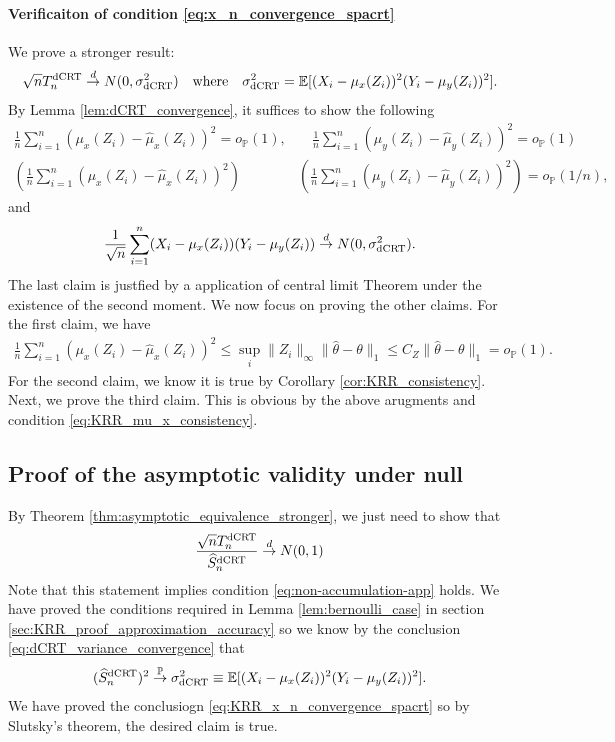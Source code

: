 \documentclass[12pt]{article}
\theoremstyle{definition}
\def\P{\mathbb{P}}
\def\P{\mathbb{P}}
\newcommand{\E}{\mathbb E}								%
\renewcommand{\P}{\mathbb{P}}							%
\newcommand{\convp}{\overset{\mathbb{P}}{\rightarrow}}             %
\newcommand{\convd}{\overset d \rightarrow}             %
\newcommand{\srx}{X}									%
\newcommand{\srz}{Z}									%
\newcommand{\sry}{Y}									%
\newcommand{\dCRT}{\textnormal{dCRT}} 					%
\begin{document}
\paragraph{Verificaiton of condition \eqref{eq:x_n_convergence_spacrt}}

We prove a stronger result: 
\begin{align}\label{eq:KRR_x_n_convergence_spacrt}
  \sqrt{n}T_n^{\dCRT}\convd N(0,\sigma^2_{\dCRT})\quad\text{where}\quad
  \sigma^2_{\dCRT}=\E[(\srx_i-\mu_x(\srz_i))^2(\sry_i-\mu_y(\srz_i))^2].
\end{align}
By Lemma \ref{lem:dCRT_convergence}, it suffices to show the following 
\begin{align*}
  \frac{1}{n}\sum_{i=1}^n(\mu_x(\srz_i)-\widehat{\mu}_x(\srz_i))^2=o_\P(1),
  &
  \quad\frac{1}{n}\sum_{i=1}^n(\mu_y(\srz_i)-\widehat{\mu}_y(\srz_i))^2=o_\P(1)\\
  \left(\frac{1}{n}\sum_{i=1}^n(\mu_x(\srz_i)-\widehat{\mu}_x(\srz_i))^2\right)
  &
  \left(\frac{1}{n}\sum_{i=1}^n(\mu_y(\srz_i)-\widehat{\mu}_y(\srz_i))^2\right)=o_\P(1/n),
\end{align*}
and 
\begin{align*}
  \frac{1}{\sqrt{n}}\sum_{i=1}^n (\srx_i-\mu_x(\srz_i))(\sry_i-\mu_y(\srz_i))\convd N(0,\sigma^2_{\dCRT}).
\end{align*}
The last claim is justfied by a application of central limit Theorem under the existence of the second moment. We now focus on proving the other claims. For the first claim, we have 
\begin{align*}
  \frac{1}{n}\sum_{i=1}^n(\mu_x(\srz_i)-\widehat{\mu}_x(\srz_i))^2\leq \sup_i\|\srz_i\|_{\infty}\|\widehat{\theta}-\theta\|_1\leq C_Z\|\widehat{\theta}-\theta\|_1=o_\P(1).
\end{align*}
For the second claim, we know it is true by Corollary \ref{cor:KRR_consistency}. Next, we prove the third claim. This is obvious by the above arugments and condition \eqref{eq:KRR_mu_x_consistency}.



\subsection{Proof of the asymptotic validity under null}\label{sec:KRR_proof_validity_under_null}

By Theorem \ref{thm:asymptotic_equivalence_stronger}, we just need to show that 
\begin{align*}
  \frac{\sqrt{n}T_n^{\dCRT}}{\widehat{S}_n^{\dCRT}}\convd N(0,1)
\end{align*}
Note that this statement implies condition \eqref{eq:non-accumulation-app} holds. We have proved the conditions required in Lemma \ref{lem:bernoulli_case} in section \ref{sec:KRR_proof_approximation_accuracy} so we know by the conclusion \eqref{eq:dCRT_variance_convergence} that 
\begin{align*}
  (\widehat S_n^{\dCRT})^2\convp \sigma_{\dCRT}^2\equiv \E[(\srx_i-\mu_x(\srz_i))^2(\sry_i-\mu_y(\srz_i))^2].
\end{align*}
We have proved the conclusiogn \eqref{eq:KRR_x_n_convergence_spacrt} so by Slutsky's theorem, the desired claim is true.
\end{document}
